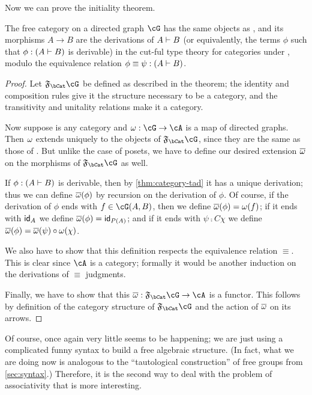 Now we can prove the initiality theorem.

\begin{thm}\label{thm:category-initial-1}
  The free category on a directed graph $\cG$ has the same objects as \cG, and its morphisms $A\to B$ are the derivations of $A\vdash B$ (or equivalently, the terms $\phi$ such that $\phi :(A\vdash B)$ is derivable) in the cut-ful type theory for categories under \cG, modulo the equivalence relation $\phi\equiv \psi:(A\vdash B)$.
\end{thm}
\begin{proof}
  Let $\F\bCat\cG$ be defined as described in the theorem; the identity and composition rules give it the structure necessary to be a category, and the transitivity and unitality relations make it a category.

  Now suppose \cA is any category and $\pfree:\cG\to\cA$ is a map of directed graphs.
  Then $\omega$ extends uniquely to the objects of $\F\bCat\cG$, since they are the same as those of \cG.
  But unlike the case of posets, we have to define our desired extension $\overline{\omega}$ on the morphisms of $\F\bCat\cG$ as well.

  If $\phi :(A\vdash B)$ is derivable, then by \cref{thm:category-tad} it has a unique derivation; thus we can define $\overline{\omega}(\phi)$ by recursion on the derivation of $\phi$.
  Of course, if the derivation of $\phi$ ends with $f\in\cG(A,B)$, then we define $\overline{\omega}(\phi)=\omega(f)$; if it ends with $\mathsf{id}_A$ we define $\overline{\omega}(\phi)=\mathsf{id}_{P(A)}$; and if it ends with $\psi\comp{C}\chi$ we define $\overline{\omega}(\phi) = \overline{\omega}(\psi)\circ \omega(\chi)$.

  We also have to show that this definition respects the equivalence relation $\equiv$.
  This is clear since $\cA$ is a category; formally it would be another induction on the derivations of $\equiv$ judgments.

  Finally, we have to show that this $\free:\F\bCat\cG\to\cA$ is a functor.
  This follows by definition of the category structure of $\F\bCat\cG$ and the action of $\overline{\omega}$ on its arrows.
\end{proof}

Of course, once again very little seems to be happening; we are just using a complicated funny syntax to build a free algebraic structure.
(In fact, what we are doing now is analogous to the ``tautological construction'' of free groups from \cref{sec:syntax}.)
Therefore, it is the second way to deal with the problem of associativity that is more interesting.

